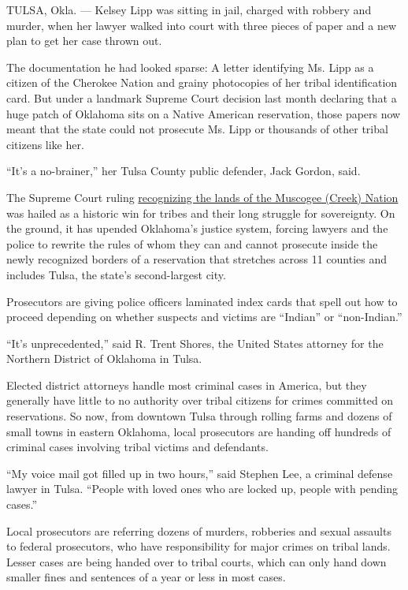 TULSA, Okla. --- Kelsey Lipp was sitting in jail, charged with robbery
and murder, when her lawyer walked into court with three pieces of paper
and a new plan to get her case thrown out.

The documentation he had looked sparse: A letter identifying Ms. Lipp as
a citizen of the Cherokee Nation and grainy photocopies of her tribal
identification card. But under a landmark Supreme Court decision last
month declaring that a huge patch of Oklahoma sits on a Native American
reservation, those papers now meant that the state could not prosecute
Ms. Lipp or thousands of other tribal citizens like her.

``It's a no-brainer,'' her Tulsa County public defender, Jack Gordon,
said.

The Supreme Court ruling
\href{https://www.nytimes3xbfgragh.onion/2020/07/09/us/supreme-court-oklahoma-mcgirt-creek-nation.html}{recognizing
the lands of the Muscogee (Creek) Nation} was hailed as a historic win
for tribes and their long struggle for sovereignty. On the ground, it
has upended Oklahoma's justice system, forcing lawyers and the police to
rewrite the rules of whom they can and cannot prosecute inside the newly
recognized borders of a reservation that stretches across 11 counties
and includes Tulsa, the state's second-largest city.

Prosecutors are giving police officers laminated index cards that spell
out how to proceed depending on whether suspects and victims are
``Indian'' or ``non-Indian.''

``It's unprecedented,'' said R. Trent Shores, the United States attorney
for the Northern District of Oklahoma in Tulsa.

Elected district attorneys handle most criminal cases in America, but
they generally have little to no authority over tribal citizens for
crimes committed on reservations. So now, from downtown Tulsa through
rolling farms and dozens of small towns in eastern Oklahoma, local
prosecutors are handing off hundreds of criminal cases involving tribal
victims and defendants.

``My voice mail got filled up in two hours,'' said Stephen Lee, a
criminal defense lawyer in Tulsa. ``People with loved ones who are
locked up, people with pending cases.''

Local prosecutors are referring dozens of murders, robberies and sexual
assaults to federal prosecutors, who have responsibility for major
crimes on tribal lands. Lesser cases are being handed over to tribal
courts, which can only hand down smaller fines and sentences of a year
or less in most cases.

